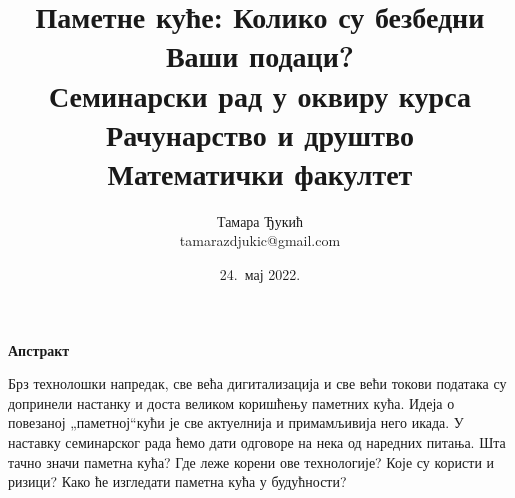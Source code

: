 \documentclass[a4paper]{article}
\begin{document}
\title{Паметне куће: Колико су безбедни Ваши подаци?\\ \small{Семинарски рад у оквиру курса\\Рачунарство и друштво\\Математички факултет}}

\author{Тамара Ђукић\\ tamarazdjukic@gmail.com}
\date{24.~мај 2022.}
\maketitle

\begin{center}
    \textbf{Апстракт}
\end{center}
\hspace{0.5cm}Брз технолошки напредак, све већа дигитализација и све већи токови података су допринели настанку и доста великом коришћењу паметних кућа. Идеја о
повезаној „паметној“\space кући је све актуелнија и примамљивија него икада. У наставку семинарског рада ћемо дати одговоре на нека од наредних питања.
Шта тачно значи паметна кућа? Где леже корени ове технологије? Које су користи и ризици? Како ће изгледати паметна кућа у будућности?

\newpage

\tableofcontents

\newpage
\end{document}
